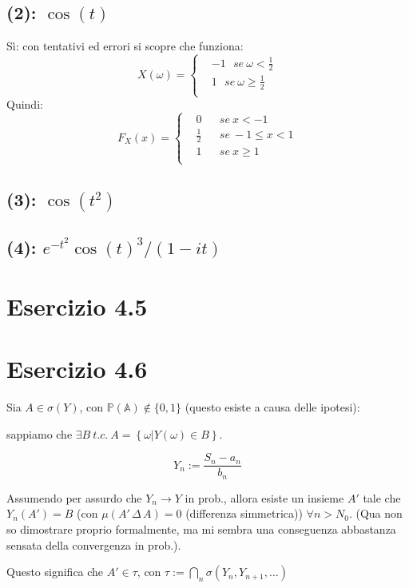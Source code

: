\documentclass{article}
\begin{document}
\subsection{(2): $\cos(t)$}
Sì: con tentativi ed errori si scopre che funziona:
\[X(\omega ) = \left\{\begin{aligned}
&-1\ \ \ se\ \omega <\frac{1}{2}\\
& 1\ \ \ se\ \omega \geq \frac{1}{2}\\
\end{aligned}\right.\]
Quindi:
\[F_X(x) = \left\{\begin{aligned}
&0 && se\ x<-1\\
& \frac{1}{2} && se\ -1\leq x<1\\
& 1 & & se\ x\geq 1\\
\end{aligned}\right.\]

\subsection{(3): $\cos(t^2)$}

\subsection{(4): $e^{-t^2}\cos(t)^3/(1-it)$}

\section{Esercizio 4.5}

\section{Esercizio 4.6}
Sia $A\in \sigma (Y)$, con $\mathbb{P(A)}\notin \{0,1\}$ (questo esiste a causa delle ipotesi):

sappiamo che $\exists B \ t.c.\ A=\left\{\omega | Y(\omega )\in B\right\}$.

\[Y_n := \frac{S_n-a_n}{b_n}\]

Assumendo per assurdo che $Y_n\rightarrow Y$ in prob., allora esiste un insieme $A'$ tale che $Y_n(A') = B$ (con $\mu (A'\, \Delta\, A) = 0$ (differenza simmetrica)) $\forall n > N_0$. (Qua non so dimostrare proprio formalmente, ma mi sembra una conseguenza abbastanza sensata della convergenza in prob.).

Questo significa che $A' \in \tau  $, con $\tau :=\bigcap _n \sigma (Y_n, Y_{n+1}, \dots)$
\end{document}
